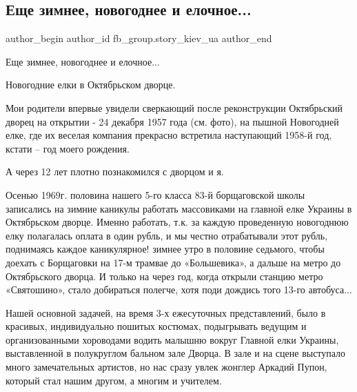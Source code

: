  
 
 
 
 
 
\subsection{Еще зимнее, новогоднее и елочное...}
\label{sec:01_01_2022.fb.fb_group.story_kiev_ua.2.zimnee}
 
\ifcmt
 author_begin
   author_id fb_group.story_kiev_ua
 author_end
\fi

Еще зимнее, новогоднее и елочное... 

Новогодние елки в Октябрьском дворце.

Мои родители впервые увидели сверкающий после реконструкции Октябрьский дворец
на открытии - 24 декабря 1957 года (см. фото), на пышной Новогодней елке, где
их веселая компания прекрасно встретила наступающий 1958-й год, кстати – год
моего рождения.

А через 12 лет плотно познакомился с дворцом и я.

Осенью 1969г. половина нашего 5-го класса 83-й борщаговской школы записались на
зимние каникулы работать массовиками на главной елке Украины в Октябрьском
дворце. Именно работать, т.к. за каждую проведенную новогоднюю елку полагалась
оплата в один рубль, и мы честно отрабатывали этот рубль, поднимаясь каждое
каникулярное! зимнее утро в половине седьмого, чтобы доехать с Борщаговки на
17-м трамвае до «Большевика», а дальше на метро до Октябрьского дворца. И
только на через год, когда открыли станцию метро «Святошино», стало добираться
полегче, хотя поди дождись того 13-го автобуса...

Нашей основной задачей, на время 3-х ежесуточных представлений, было в
красивых, индивидуально пошитых костюмах, подыгрывать ведущим и организованными
хороводами водить малышню вокруг Главной елки Украины, выставленной в
полукруглом бальном зале Дворца. В зале и на сцене выступало много
замечательных артистов, но нас сразу увлек жонглер Аркадий Пупон, который стал
нашим другом, а многим и учителем.

